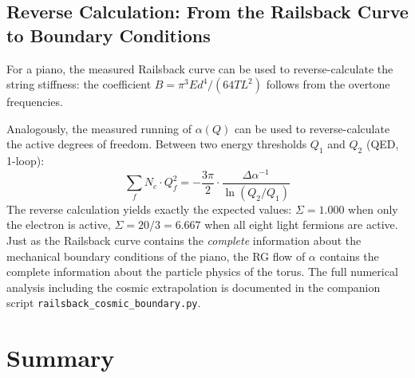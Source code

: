 \subsection{Reverse Calculation: From the Railsback Curve to Boundary Conditions}

For a piano, the measured Railsback curve can be used to reverse-calculate the string stiffness: the coefficient $B = \pi^3 E d^4 / (64 T L^2)$ follows from the overtone frequencies.

Analogously, the measured running of $\alpha(Q)$ can be used to reverse-calculate the active degrees of freedom. Between two energy thresholds $Q_1$ and $Q_2$ (QED, 1-loop):
\begin{equation}
	\sum_f N_c \cdot Q_f^2 = -\frac{3\pi}{2} \cdot \frac{\Delta\alpha^{-1}}{\ln(Q_2/Q_1)}
\end{equation}
The reverse calculation yields exactly the expected values: $\Sigma = 1.000$ when only the electron is active, $\Sigma = 20/3 = 6.667$ when all eight light fermions are active. Just as the Railsback curve contains the \emph{complete} information about the mechanical boundary conditions of the piano, the RG flow of $\alpha$ contains the complete information about the particle physics of the torus. The full numerical analysis including the cosmic extrapolation is documented in the companion script \texttt{railsback\_cosmic\_boundary.py}.

\section{Summary}

